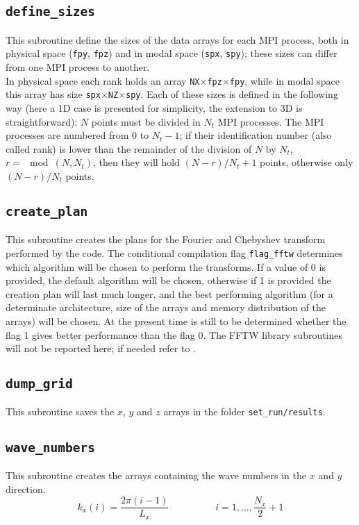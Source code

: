 \subsection{\texttt{define\_sizes}}
This subroutine define the sizes of the data arrays for each MPI process, both in physical space (\texttt{fpy}, \texttt{fpz}) and in modal space (\texttt{spx}, \texttt{spy}); these sizes can differ from one MPI process to another.\\
In physical space each rank holds an array \texttt{NX}$\times$\texttt{fpz}$\times$\texttt{fpy}, while in modal space this array has size \texttt{spx}$\times$\texttt{NZ}$\times$\texttt{spy}. Each of these sizes is defined in the following way (here a 1D case is presented for simplicity, the extension to 3D is straightforward): $N$ points must be divided in $N_t$ MPI processes. The MPI processes are numbered from 0 to $N_t-1$; if their identification number (also called rank) is lower than the remainder of the division of $N$ by $N_t$, $r=\mod(N,N_t)$, then they will hold $(N-r)/N_t+1$ points, otherwise only $(N-r)/N_t$ points.

\subsection{\texttt{create\_plan}}
This subroutine creates the plans for the Fourier and Chebyshev transform performed by the code. The conditional compilation flag \texttt{flag\_fftw} determines which algorithm will be chosen to perform the transforms. If a value of 0 is provided, the default algorithm will be chosen, otherwise if 1 is provided the creation plan will last much longer, and the best performing algorithm (for a determinate architecture, size of the arrays and memory distribution of the arrays) will be chosen. At the present time is still to be determined whether the
flag 1 gives better performance than the flag 0. The FFTW library subroutines will not be reported here; if needed refer to \cite{fftw}.

\subsection{\texttt{dump\_grid}}
This subroutine saves the $x$, $y$ and $z$ arrays in the folder \texttt{set\_run/results}.

\subsection{\texttt{wave\_numbers}}
This subroutine creates the arrays containing the wave numbers in the $x$ and $y$ direction.
\[
k_x(i)=\frac{2\pi(i-1)}{L_x} \hspace{2cm} i=1,\dots,\frac{N_x}{2}+1
\]


